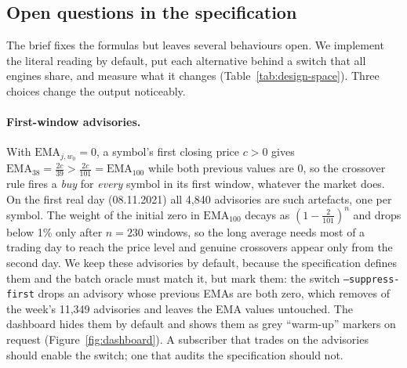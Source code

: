 \subsection{Open questions in the specification}
\label{sec:design-space}

The brief fixes the formulas but leaves several behaviours open.
We implement the literal reading by default, put each alternative behind a switch that all engines share, and measure what it changes (Table~\ref{tab:design-space}).
Three choices change the output noticeably.

\paragraph{First-window advisories.}
With $\mathrm{EMA}_{j,w_0}=0$, a symbol's first closing price $c>0$ gives $\mathrm{EMA}_{38}=\frac{2c}{39} > \frac{2c}{101}=\mathrm{EMA}_{100}$ while both previous values are $0$, so the crossover rule fires a \emph{buy} for \emph{every} symbol in its first window, whatever the market does.
On the first real day (08.11.2021) all 4,840 advisories are such artefacts, one per symbol.
The weight of the initial zero in $\mathrm{EMA}_{100}$ decays as $(1-\frac{2}{101})^n$ and drops below 1\% only after $n=230$ windows, so the long average needs most of a trading day to reach the price level and genuine crossovers appear only from the second day.
We keep these advisories by default, because the specification defines them and the batch oracle must match it, but mark them: the switch \texttt{--suppress-first} drops an advisory whose previous EMAs are both zero, which removes  of the week's 11,349 advisories  and leaves the EMA values untouched.
The dashboard hides them by default and shows them as grey ``warm-up'' markers on request (Figure~\ref{fig:dashboard}).
A subscriber that trades on the advisories should enable the switch; one that audits the specification should not.


